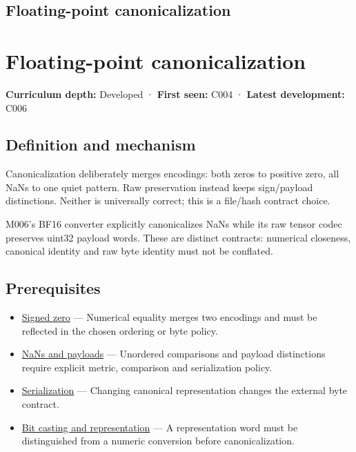 \hypertarget{appendix-e90053a4b201}{}
\section*{Floating-point canonicalization}
\chapter{Floating-point canonicalization}\label{appendix-e90053a4b201-floating-point-canonicalization}

\textbf{Curriculum depth:} Developed · \textbf{First seen:} C004 · \textbf{Latest development:} C006

\section{Definition and mechanism}\label{appendix-e90053a4b201-definition-and-mechanism}

Canonicalization deliberately merges encodings: both zeros to positive zero, all NaNs to one quiet pattern. Raw preservation instead keeps sign/payload distinctions. Neither is universally correct; this is a file/hash contract choice.

M006's BF16 converter explicitly canonicalizes NaNs while its raw tensor codec preserves uint32 payload words. These are distinct contracts: numerical closeness, canonical identity and raw byte identity must not be conflated.

\section{Prerequisites}\label{appendix-e90053a4b201-prerequisites}

\begin{itemize}
\tightlist
\item
  \hyperref[appendix-3a048f032c1f]{Signed zero} --- Numerical equality merges two encodings and must be reflected in the chosen ordering or byte policy.
\item
  \hyperref[appendix-d6607cc4c235]{NaNs and payloads} --- Unordered comparisons and payload distinctions require explicit metric, comparison and serialization policy.
\item
  \hyperref[appendix-91d09ebed979]{Serialization} --- Changing canonical representation changes the external byte contract.
\item
  \hyperref[appendix-34ee45f161c1]{Bit casting and representation} --- A representation word must be distinguished from a numeric conversion before canonicalization.
\end{itemize}

